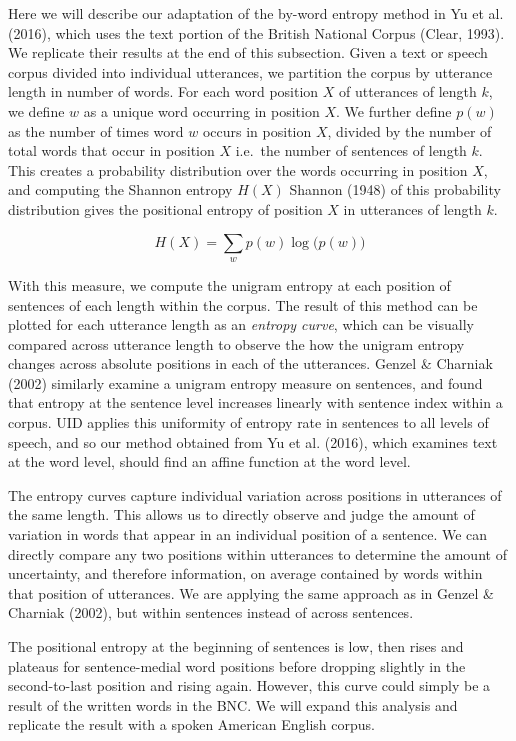 \documentclass[10pt, letterpaper]{article}
\begin{document}
Here we will describe our adaptation of the by-word entropy method in Yu
et al. (2016), which uses the text portion of the British National
Corpus (Clear, 1993). We replicate their results at the end of this
subsection. Given a text or speech corpus divided into individual
utterances, we partition the corpus by utterance length in number of
words. For each word position \(X\) of utterances of length \(k\), we
define \(w\) as a unique word occurring in position \(X\). We further
define \(p(w)\) as the number of times word \(w\) occurs in position
\(X\), divided by the number of total words that occur in position \(X\)
i.e.~the number of sentences of length \(k\). This creates a probability
distribution over the words occurring in position \(X\), and computing
the Shannon entropy \(H(X)\) Shannon (1948) of this probability
distribution gives the positional entropy of position \(X\) in
utterances of length \(k\).

\[H(X) = \sum\limits_w p(w)\log\big(p(w)\big)\]

With this measure, we compute the unigram entropy at each position of
sentences of each length within the corpus. The result of this method
can be plotted for each utterance length as an \emph{entropy curve},
which can be visually compared across utterance length to observe the
how the unigram entropy changes across absolute positions in each of the
utterances. Genzel \& Charniak (2002) similarly examine a unigram
entropy measure on sentences, and found that entropy at the sentence
level increases linearly with sentence index within a corpus. UID
applies this uniformity of entropy rate in sentences to all levels of
speech, and so our method obtained from Yu et al. (2016), which examines
text at the word level, should find an affine function at the word
level.

The entropy curves capture individual variation across positions in
utterances of the same length. This allows us to directly observe and
judge the amount of variation in words that appear in an individual
position of a sentence. We can directly compare any two positions within
utterances to determine the amount of uncertainty, and therefore
information, on average contained by words within that position of
utterances. We are applying the same approach as in Genzel \& Charniak
(2002), but within sentences instead of across sentences.

The positional entropy at the beginning of sentences is low, then rises
and plateaus for sentence-medial word positions before dropping slightly
in the second-to-last position and rising again. However, this curve
could simply be a result of the written words in the BNC. We will expand
this analysis and replicate the result with a spoken American English
corpus.
\end{document}
